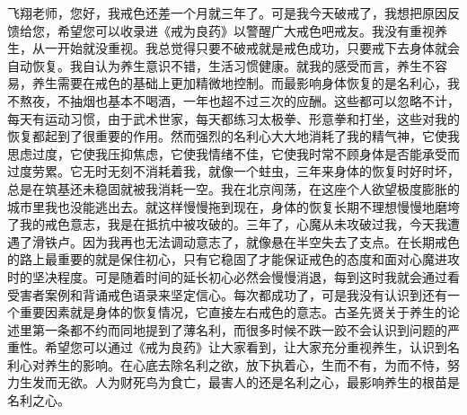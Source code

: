 \begin{case}
    飞翔老师，您好，我戒色还差一个月就三年了。可是我今天破戒了，我想把原因反馈给您，希望您可以收录进《戒为良药》以警醒广大戒色吧戒友。我没有重视养生，从一开始就没重视。我总觉得只要不破戒就是戒色成功，只要戒下去身体就会自动恢复。我自认为养生意识不错，生活习惯健康。就我的感受而言，养生不容易，养生需要在戒色的基础上更加精微地控制。而最影响身体恢复的是名利心，我不熬夜，不抽烟也基本不喝酒，一年也超不过三次的应酬。这些都可以忽略不计，每天有运动习惯，由于武术世家，每天都练习太极拳、形意拳和打坐，这些对我的恢复都起到了很重要的作用。然而强烈的名利心大大地消耗了我的精气神，它使我思虑过度，它使我压抑焦虑，它使我情绪不佳，它使我时常不顾身体是否能承受而过度劳累。它无时无刻不消耗着我，就像一个蛀虫，三年来身体的恢复时好时坏，总是在筑基还未稳固就被我消耗一空。我在北京闯荡，在这座个人欲望极度膨胀的城市里我也没能逃出去。就这样慢慢拖到现在，身体的恢复长期不理想慢慢地磨垮了我的戒色意志，我是在抵抗中被攻破的。三年了，心魔从未攻破过我，今天我遭遇了滑铁卢。因为我再也无法调动意志了，就像悬在半空失去了支点。在长期戒色的路上最重要的就是保住初心，只有它稳固了才能保证戒色的态度和面对心魔进攻时的坚决程度。可是随着时间的延长初心必然会慢慢消退，每到这时我就会通过看受害者案例和背诵戒色语录来坚定信心。每次都成功了，可是我没有认识到还有一个重要因素就是身体的恢复情况，它直接左右戒色的意志。古圣先贤关于养生的论述里第一条都不约而同地提到了薄名利，而很多时候不跌一跤不会认识到问题的严重性。希望您可以通过《戒为良药》让大家看到，让大家充分重视养生，认识到名利心对养生的影响。在心底去除名利之欲，放下执着心，生而不有，为而不恃，努力生发而无欲。人为财死鸟为食亡，最害人的还是名利之心，最影响养生的根苗是名利之心。


\end{case}
